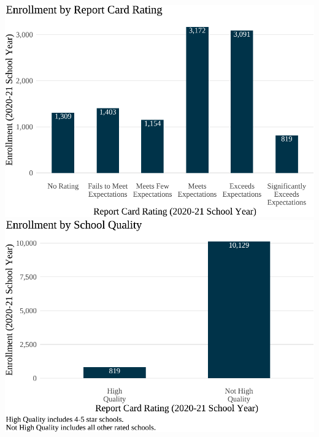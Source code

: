 \documentclass[
]{article}
\begin{document}
\includegraphics[width=0.5\linewidth]{drake_latonya_assembly_files/figure-latex/unnamed-chunk-2-1}
\includegraphics[width=0.5\linewidth]{drake_latonya_assembly_files/figure-latex/unnamed-chunk-2-2}

\newpage
\begingroup\fontsize{8}{10}\selectfont
\end{document}
